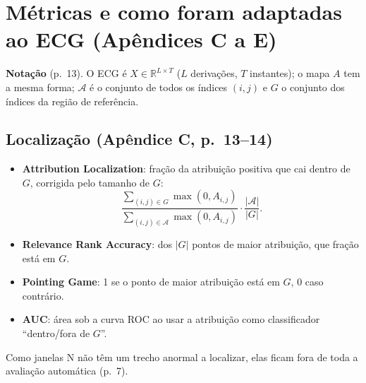 \documentclass[11pt,a4paper]{article}
\begin{document}
\section{Métricas e como foram adaptadas ao ECG (Apêndices C a E)}
\textbf{Notação} (p.~13). O ECG é $X \in \mathbb{R}^{L\times T}$ ($L$ derivações, $T$ instantes); o mapa $A$ tem a mesma forma; $\mathcal{A}$ é o conjunto de todos os índices $(i,j)$ e $G$ o conjunto dos índices da região de referência.

\subsection{Localização (Apêndice C, p.~13--14)}
\begin{itemize}
\item \textbf{Attribution Localization}: fração da atribuição positiva que cai dentro de $G$, corrigida pelo tamanho de $G$:
\[ \frac{\sum_{(i,j)\in G}\max(0,A_{i,j})}{\sum_{(i,j)\in \mathcal{A}}\max(0,A_{i,j})}\cdot\frac{|\mathcal{A}|}{|G|}. \]
\item \textbf{Relevance Rank Accuracy}: dos $|G|$ pontos de maior atribuição, que fração está em $G$.
\item \textbf{Pointing Game}: 1 se o ponto de maior atribuição está em $G$, 0 caso contrário.
\item \textbf{AUC}: área sob a curva ROC ao usar a atribuição como classificador “dentro/fora de $G$”.
\end{itemize}
Como janelas N não têm um trecho anormal a localizar, elas ficam fora de toda a avaliação automática (p.~7).
\end{document}
